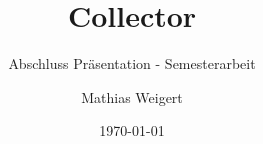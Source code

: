\title [Collector] {Collector}										%
\subtitle [Semesterarbeit] {Abschluss Präsentation - Semesterarbeit}%

\author[M. Weigert] {Mathias Weigert}								%

\date{\today}														%


\subject{Abschluss Präsentation Semesterarbeit}						%
